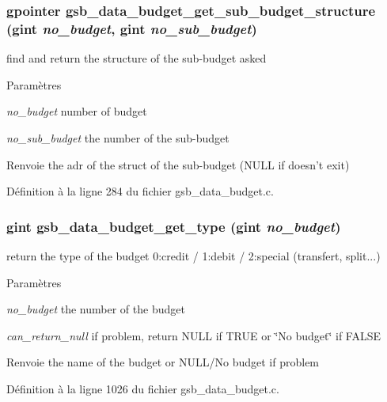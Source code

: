 \subsubsection[{gsb\_\-data\_\-budget\_\-get\_\-sub\_\-budget\_\-structure}]{\setlength{\rightskip}{0pt plus 5cm}gpointer gsb\_\-data\_\-budget\_\-get\_\-sub\_\-budget\_\-structure (gint {\em no\_\-budget}, \/  gint {\em no\_\-sub\_\-budget})}\label{gsb__data__budget_8c_a6f2e832890d1351f46fa91d33e4d55d4}
find and return the structure of the sub-\/budget asked


\begin{DoxyParams}{Paramètres}
\item[{\em no\_\-budget}]number of budget \item[{\em no\_\-sub\_\-budget}]the number of the sub-\/budget\end{DoxyParams}
\begin{DoxyReturn}{Renvoie}
the adr of the struct of the sub-\/budget (NULL if doesn't exit) 
\end{DoxyReturn}


Définition à la ligne 284 du fichier gsb\_\-data\_\-budget.c.

\subsubsection[{gsb\_\-data\_\-budget\_\-get\_\-type}]{\setlength{\rightskip}{0pt plus 5cm}gint gsb\_\-data\_\-budget\_\-get\_\-type (gint {\em no\_\-budget})}\label{gsb__data__budget_8c_a11b94ff79cd2f1c623fd8e83463a2321}
return the type of the budget 0:credit / 1:debit / 2:special (transfert, split...)


\begin{DoxyParams}{Paramètres}
\item[{\em no\_\-budget}]the number of the budget \item[{\em can\_\-return\_\-null}]if problem, return NULL if TRUE or \char`\"{}No budget\char`\"{} if FALSE\end{DoxyParams}
\begin{DoxyReturn}{Renvoie}
the name of the budget or NULL/No budget if problem 
\end{DoxyReturn}


Définition à la ligne 1026 du fichier gsb\_\-data\_\-budget.c.

